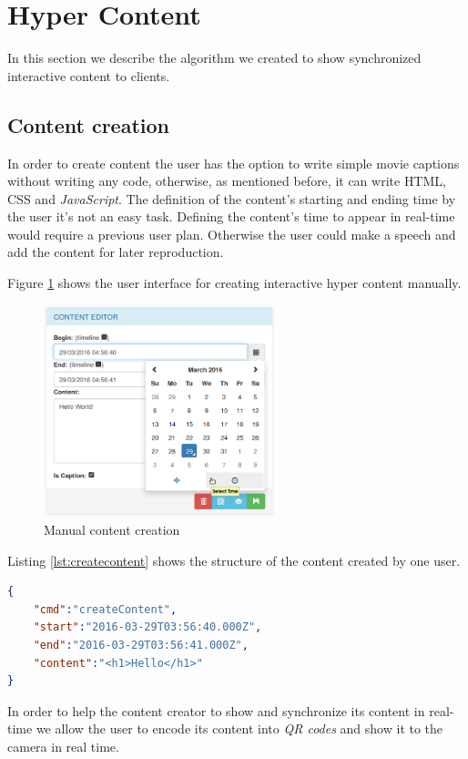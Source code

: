 \section{Hyper Content}
	In this section we describe the algorithm we created to show synchronized interactive content to clients.


	\subsection{Content creation}

	In order to create content the user has the option to write simple movie captions without writing any code, otherwise, as mentioned before, it can write \ac{HTML}, \ac{CSS} and \emph{JavaScript}. The definition of the content's starting and ending time by the user it's not an easy task. Defining the content's time to appear in real-time would require a previous user plan. Otherwise the user could make a speech and add the content for later reproduction.

	Figure \ref{fig:creation} shows the user interface for creating interactive hyper content manually.

	\begin{figure}[H]
		\centering
		\includegraphics[width=0.6\textwidth]{figures/edition.png}
		\caption{Manual content creation}
		\label{fig:creation}
	\end{figure}


	Listing \ref{lst:createcontent} shows the structure of the content created by one user.

\begin{minipage}{\linewidth}
\begin{lstlisting}[caption={Exampe of content created by one user},label={lst:createcontent},language=json]
{
	"cmd":"createContent",
	"start":"2016-03-29T03:56:40.000Z",
	"end":"2016-03-29T03:56:41.000Z",
	"content":"<h1>Hello</h1>"
}
\end{lstlisting}
\end{minipage}
	In order to help the content creator to show and synchronize its content in real-time we allow the user to encode its content into \emph{QR codes} and show it to the camera in real time.

